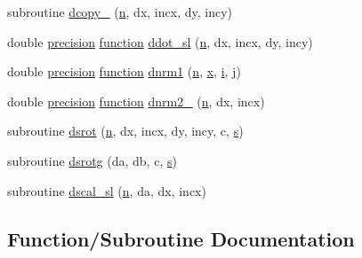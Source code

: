 \begin{DoxyCompactItemize}
\item 
subroutine \hyperlink{slsqp__optmz_8f_a8e1b79a2e83c95bcabef2107ba66173d}{dcopy\+\_\+} (\hyperlink{indexexpr_8h_ab427e2e2b4d6cec55fa088ea2a692ace}{n}, dx, incx, dy, incy)
\item 
double \hyperlink{numinquire_8h_a2c8e616467665d0b2814d4c1589ba74e}{precision} \hyperlink{afunc_8m_a7b5e596df91eadea6c537c0825e894a7}{function} \hyperlink{slsqp__optmz_8f_a6513a1a87cfc14f94b7b06cc57027702}{ddot\+\_\+sl} (\hyperlink{indexexpr_8h_ab427e2e2b4d6cec55fa088ea2a692ace}{n}, dx, incx, dy, incy)
\item 
double \hyperlink{numinquire_8h_a2c8e616467665d0b2814d4c1589ba74e}{precision} \hyperlink{afunc_8m_a7b5e596df91eadea6c537c0825e894a7}{function} \hyperlink{slsqp__optmz_8f_a0c86360bc31c1be3d47c2868d6b3e7a6}{dnrm1} (\hyperlink{indexexpr_8h_ab427e2e2b4d6cec55fa088ea2a692ace}{n}, \hyperlink{vecnorm1_8cc_ac73eed9e41ec09d58f112f06c2d6cb63}{x}, \hyperlink{indexexpr_8h_aabd77643995707c185e95c8cb2782c81}{i}, \hyperlink{indexexpr_8h_aa1f3325d66516548e69238097857fa98}{j})
\item 
double \hyperlink{numinquire_8h_a2c8e616467665d0b2814d4c1589ba74e}{precision} \hyperlink{afunc_8m_a7b5e596df91eadea6c537c0825e894a7}{function} \hyperlink{slsqp__optmz_8f_a74002033db9ea2981c605ebaec4a38e9}{dnrm2\+\_\+} (\hyperlink{indexexpr_8h_ab427e2e2b4d6cec55fa088ea2a692ace}{n}, dx, incx)
\item 
subroutine \hyperlink{slsqp__optmz_8f_a3342c93ff8bc567882b1e16f32a0015e}{dsrot} (\hyperlink{indexexpr_8h_ab427e2e2b4d6cec55fa088ea2a692ace}{n}, dx, incx, dy, incy, c, \hyperlink{indexexpr_8h_ae024b0db549122b44c349ae28ec990dc}{s})
\item 
subroutine \hyperlink{slsqp__optmz_8f_a84791649c4c0eea5f1b7fdd5d1a0c21b}{dsrotg} (da, db, c, \hyperlink{indexexpr_8h_ae024b0db549122b44c349ae28ec990dc}{s})
\item 
subroutine \hyperlink{slsqp__optmz_8f_a8eeb2cdfd4005a225e164cd6118aa98f}{dscal\+\_\+sl} (\hyperlink{indexexpr_8h_ab427e2e2b4d6cec55fa088ea2a692ace}{n}, da, dx, incx)
\end{DoxyCompactItemize}


\subsection{Function/\+Subroutine Documentation}
\hypertarget{slsqp__optmz_8f_aac2a4a30b48f56831ca3f9cc7f455ee9}{}
